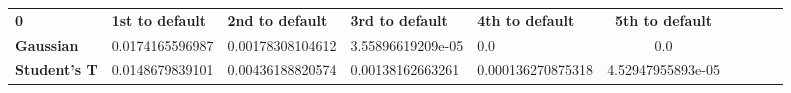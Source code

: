 \begin{tabular}{|l|l|l|l|l|c|c|c|c|c|}
\hline
\textbf{0} & \textbf{1st to default} & \textbf{2nd to default} & \textbf{3rd to default} & \textbf{4th to default} & \textbf{5th to default}\\\hhline{|=|=|=|=|=|=|}
\textbf{Gaussian} & 0.0174165596987 & 0.00178308104612 & 3.55896619209e-05 & 0.0 & 0.0\\
\textbf{Student's T} & 0.0148679839101 & 0.00436188820574 & 0.00138162663261 & 0.000136270875318 & 4.52947955893e-05\\
\hline
\end{tabular}
